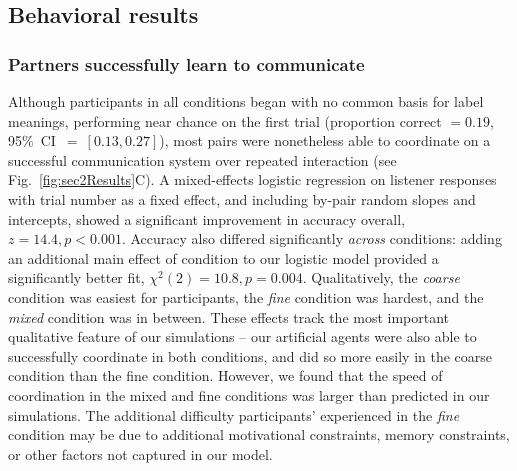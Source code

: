 \subsection{Behavioral results}

\subsubsection{Partners successfully learn to communicate}

Although participants in all conditions began with no common basis for label meanings, performing near chance on the first trial (proportion correct $= 0.19$, 95\%~CI~$=~[0.13, 0.27]$), most pairs were nonetheless able to coordinate on a successful communication system over repeated interaction (see Fig.\ \ref{fig:sec2Results}C). 
A mixed-effects logistic regression on listener responses with trial number as a fixed effect, and including by-pair random slopes and intercepts, showed a significant improvement in accuracy overall, $z = 14.4, p < 0.001$. 
Accuracy also differed significantly \emph{across} conditions: adding an additional main effect of condition to our logistic model provided a significantly better fit, $\chi^2(2) = 10.8, p = 0.004$. 
Qualitatively, the \emph{coarse} condition was easiest for participants, the \emph{fine} condition was hardest, and the \emph{mixed} condition was in between.
These effects track the most important qualitative feature of our simulations -- our artificial agents were also able to successfully coordinate in both conditions, and did so more easily in the coarse condition than the fine condition. 
However, we found that the speed of coordination in the mixed and fine conditions was larger than predicted in our simulations.
The additional difficulty participants' experienced in the \emph{fine} condition may be due to additional motivational constraints, memory constraints, or other factors not captured in our model.



